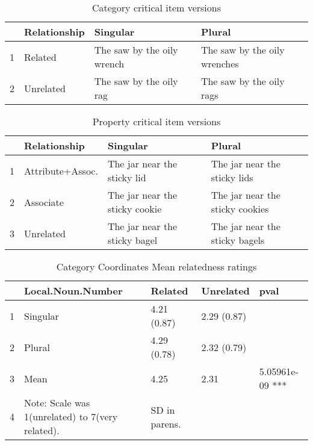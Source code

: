 \documentclass[a4paper,11pt]{article}\usepackage[]{graphicx}\usepackage[]{color}
\begin{document}
\begin{table}[ht]
\centering
\begin{tabular}{rlll}
  \hline
 & Relationship & Singular & Plural \\ 
  \hline
1 & Related & The saw by the oily wrench & The saw by the oily wrenches \\ 
  2 & Unrelated & The saw by the oily rag & The saw by the oily rags \\ 
   \hline
\end{tabular}
\caption[Category Item]{Category critical item versions} 
\end{table}


\begin{table}[ht]
\centering
\begin{tabular}{rlll}
  \hline
 & Relationship & Singular & Plural \\ 
  \hline
1 & Attribute+Assoc. & The jar near the sticky lid & The jar near the sticky lids \\ 
  2 & Associate & The jar near the sticky cookie & The jar near the sticky cookies \\ 
  3 & Unrelated & The jar near the sticky bagel & The jar near the sticky bagels \\ 
   \hline
\end{tabular}
\caption[Property Item]{Property critical item versions} 
\end{table}


\begin{table}[ht]
\centering
\begin{tabular}{rllll}
  \hline
 & Local.Noun.Number & Related & Unrelated & pval \\ 
  \hline
1 & Singular & 4.21 (0.87) & 2.29 (0.87) &   \\ 
  2 & Plural & 4.29 (0.78) & 2.32 (0.79) &   \\ 
  3 & Mean & 4.25 & 2.31 & 5.05961e-09 *** \\ 
  4 & Note: Scale was 1(unrelated) to 7(very related). & SD in parens. &   &   \\ 
   \hline
\end{tabular}
\caption[CAT COORD Relatedness]{Category Coordinates Mean relatedness ratings} 
\end{table}
\end{document}
